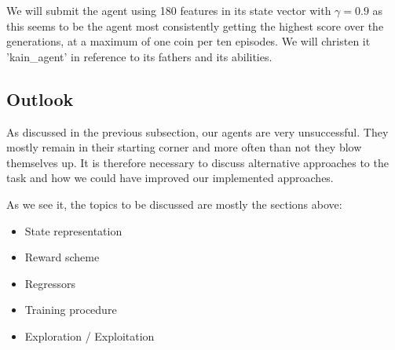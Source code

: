 We will submit the agent using 180 features in its state vector with $\gamma=0.9$ as this seems to be the agent most consistently getting the highest score over the generations, at a maximum of one coin per ten episodes. We will christen it 'kain\_agent' in reference to its fathers and its abilities.

\subsection{Outlook}
As discussed in the previous subsection, our agents are very unsuccessful. They mostly remain in their starting corner and more often than not they blow themselves up. It is therefore necessary to discuss alternative approaches to the task and how we could have improved our implemented approaches.\par


As we see it, the topics to be discussed are mostly the sections above:
\begin{itemize}
	\item State representation
	\item Reward scheme
	\item Regressors
	\item Training procedure
	\item Exploration / Exploitation
\end{itemize}

